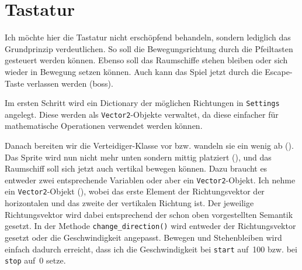 \newpage
\section{Tastatur}\label{secTastatur}

Ich möchte hier die Tastatur nicht erschöpfend behandeln, sondern lediglich das Grundprinzip verdeutlichen. So soll die Bewegungsrichtung durch die Pfeiltasten gesteuert werden können. Ebenso soll das Raumschiffe stehen bleiben oder sich wieder in Bewegung setzen können. Auch kann das Spiel jetzt durch die Escape-Taste verlassen werden (\Gls{boss}).

Im ersten Schritt wird ein Dictionary der möglichen Richtungen in \texttt{Settings} angelegt. Diese werden als \texttt{Vector2}-Objekte verwaltet, da diese einfacher für mathematische Operationen verwendet werden können.



Danach bereiten wir die Verteidiger-Klasse vor bzw. wandeln sie ein wenig ab (). Das Sprite wird nun nicht mehr unten sondern mittig platziert (), und das Raumschiff soll sich jetzt auch vertikal bewegen können. Dazu braucht es entweder zwei entsprechende Variablen oder aber ein \texttt{Vector2}-Objekt. Ich nehme ein \texttt{Vector2}-Objekt (), wobei das erste Element der Richtungsvektor der horizontalen und das zweite der vertikalen Richtung ist. Der jeweilige Richtungsvektor wird dabei entsprechend der schon oben vorgestellten Semantik gesetzt. In der Methode \texttt{change\_direction()} wird entweder der Richtungsvektor gesetzt oder die Geschwindigkeit angepasst. Bewegen und Stehenbleiben wird einfach dadurch erreicht, dass ich die Geschwindigkeit bei \texttt{start} auf~100 bzw. bei \texttt{stop} auf~0 setze.

